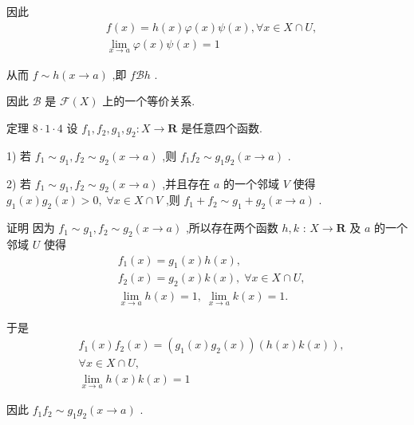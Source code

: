 因此
\begin{align*}
	&f\left( x\right)  = h\left( x\right) \varphi \left( x\right) \psi \left( x\right) ,\forall x \in  X \cap  U,\\
	&\mathop{\lim }\limits_{{x \rightarrow  a}}\varphi \left( x\right) \psi \left( x\right)  = 1
\end{align*}

从而 $f \sim  h\left( {x \rightarrow  a}\right)$ ,即 $f\mathcal{B}h$ .

因此 $\mathcal{B}$ 是 $\mathcal{F}\left( X\right)$ 上的一个等价关系.

定理 $8 \cdot  1 \cdot  4$ 设 ${f}_{1},{f}_{2},{g}_{1},{g}_{2} : X \rightarrow  \mathbf{R}$ 是任意四个函数.

1) 若 ${f}_{1} \sim  {g}_{1},{f}_{2} \sim  {g}_{2}\left( {x \rightarrow  a}\right)$ ,则 ${f}_{1}{f}_{2} \sim  {g}_{1}{g}_{2}\left( {x \rightarrow  a}\right)$ .

2) 若 ${f}_{1} \sim  {g}_{1},{f}_{2} \sim  {g}_{2}\left( {x \rightarrow  a}\right)$ ,并且存在 $a$ 的一个邻域 $V$ 使得 ${g}_{1}\left( x\right) {g}_{2}\left( x\right)  > 0,\;\forall x \in  X \cap  V$ ,则 ${f}_{1} + {f}_{2} \sim  {g}_{1} + {g}_{2}\left( {x \rightarrow  a}\right)$ .

证明 因为 ${f}_{1} \sim  {g}_{1},{f}_{2} \sim  {g}_{2}\left( {x \rightarrow  a}\right)$ ,所以存在两个函数 $h,k$ : $X \rightarrow  \mathbf{R}$ 及 $a$ 的一个邻域 $U$ 使得
\begin{align*}
	&{f}_{1}\left( x\right)  = {g}_{1}\left( x\right) h\left( x\right) ,\\
	&{f}_{2}\left( x\right)  = {g}_{2}\left( x\right) k\left( x\right) ,\;\forall x \in  X \cap  U,\\
	&\mathop{\lim }\limits_{{x \rightarrow  a}}h\left( x\right)  = 1,\;\mathop{\lim }\limits_{{x \rightarrow  a}}k\left( x\right)  = 1.
\end{align*}

于是
\begin{align*}
	&{f}_{1}\left( x\right) {f}_{2}\left( x\right)  = \left( {{g}_{1}\left( x\right) {g}_{2}\left( x\right) }\right) \left( {h\left( x\right) k\left( x\right) }\right) ,\\
	&\forall x \in  X \cap  U,\\
	&\mathop{\lim }\limits_{{x \rightarrow  a}}h\left( x\right) k\left( x\right)  = 1
\end{align*}

因此 ${f}_{1}{f}_{2} \sim  {g}_{1}{g}_{2}\left( {x \rightarrow  a}\right)$ .


